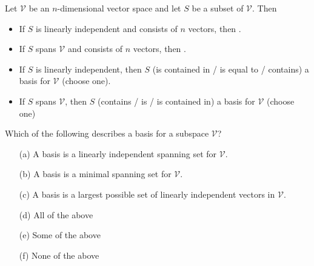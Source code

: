 \begin{thm}
    Let $\mathcal{V}$ be an $n$-dimensional vector space and let $S$ be a subset of
    $\mathcal{V}$.  Then
    \begin{itemize}
        \item If $S$ is linearly independent and consists of $n$ vectors, then
            \underline{\hspace{1in}}.
        \item If $S$ spans $\mathcal{V}$ and consists of $n$ vectors, then
            \underline{\hspace{1in}}.
        \item If $S$ is linearly independent, then $S$ (is contained in / is equal to /
            contains) a basis for $\mathcal{V}$ (choose one). 
        \item If $S$ spans $\mathcal{V}$, then $S$ (contains / is / is contained in) a
            basis for $\mathcal{V}$ (choose one)
    \end{itemize}
\end{thm}


\begin{problem}
    Which of the following describes a basis for a subspace $\mathcal{V}$?
    \begin{enumerate}
        \item[(a)] A basis is a linearly independent spanning set for $\mathcal{V}$.
        \item[(b)] A basis is a minimal spanning set for $\mathcal{V}$.
        \item[(c)] A basis is a largest possible set of linearly independent vectors in
            $\mathcal{V}$.
        \item[(d)] All of the above
        \item[(e)] Some of the above
        \item[(f)] None of the above
    \end{enumerate}
\end{problem}



